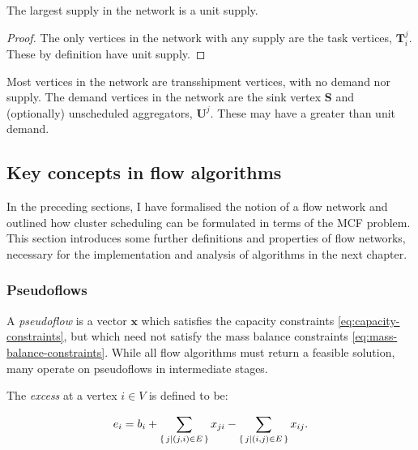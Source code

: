 \begin{lemma} \label{lemma:network-supply}
The largest supply in the network is a unit supply.
\end{lemma}
\begin{proof}
The only vertices in the network with any supply are the task vertices, $\mathbf{T}_i^j$. These by definition have unit supply.
\end{proof}

\begin{remark}
Most vertices in the network are transshipment vertices, with no demand nor supply. The demand vertices in the network are the sink vertex $\mathbf{S}$ and (optionally) unscheduled aggregators, $\mathbf{U}^j$. These may have a greater than unit demand.
\end{remark}

\subsection{Key concepts in flow algorithms}


In the preceding sections, I have formalised the notion of a flow network and outlined how cluster scheduling can be formulated in terms of the MCF problem. This section introduces some further definitions and properties of flow networks, necessary for the implementation and analysis of algorithms in the next chapter.

\subsubsection{Pseudoflows} \label{sec:prep-flow-pseudo}


A \emph{pseudoflow} is a vector $\mathbf{x}$ which satisfies the capacity constraints
\cref{eq:capacity-constraints}, but which need not satisfy the mass balance constraints \cref{eq:mass-balance-constraints}. While all flow algorithms must return a feasible solution, many operate on pseudoflows in intermediate stages. 

The \emph{excess} at a vertex $i\in V$ is defined to be:

\begin{equation}
e_i=b_i+\sum_{\set{j | (j,i)\in E}}x_{ji}-\sum_{\set{j | (i,j)\in E}}x_{ij}.
\end{equation}


